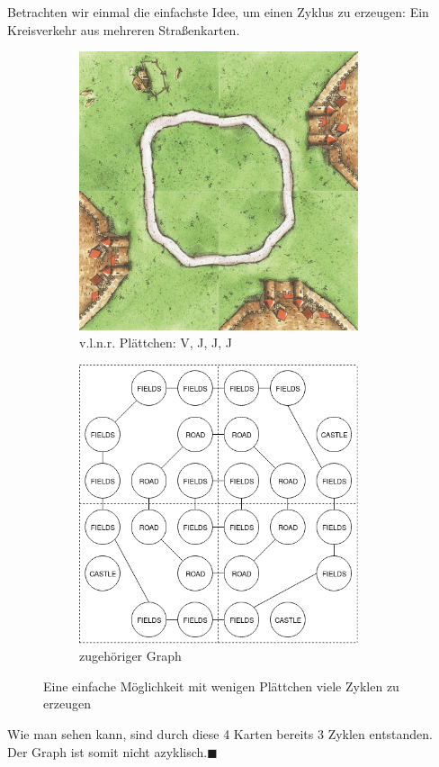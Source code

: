 \documentclass{article}
\newcommand*{\qed}{\hfill\ensuremath{\blacksquare}\\}%
\begin{document}
Betrachten wir einmal die einfachste Idee, um einen Zyklus zu erzeugen: Ein Kreisverkehr aus mehreren Stra{\ss}enkarten.
\begin{figure}[H]
	\centering
	\begin{subfigure}{.5\textwidth}
		\centering
		\includegraphics[width=0.9\textwidth]{Zyklischer_Graph.png}
		\caption{v.l.n.r. Pl\"attchen: V, J, J, J}
	\end{subfigure}%
	\begin{subfigure}{.5\textwidth}
		\centering
		\includegraphics[width=0.9\textwidth]{Zyklischer_Graph1.png}
		\caption{zugeh\"origer Graph}
	\end{subfigure}
	\caption{Eine einfache M\"oglichkeit mit wenigen Pl\"attchen viele Zyklen zu erzeugen}
\end{figure}
Wie man sehen kann, sind durch diese 4 Karten bereits 3 Zyklen entstanden.\\ Der Graph ist somit nicht azyklisch.\qed
\end{document}
